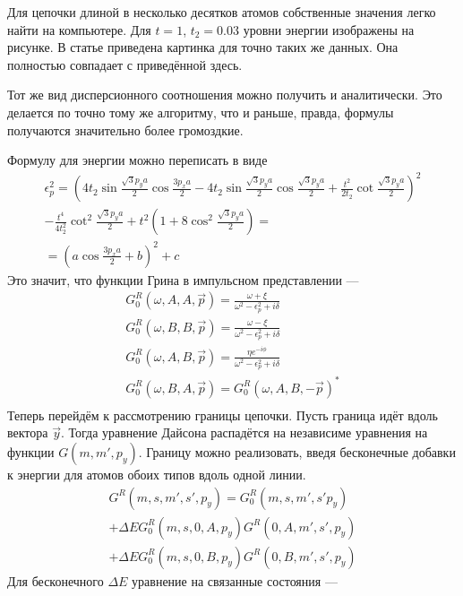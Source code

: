 	Для цепочки длиной в несколько десятков атомов собственные значения легко найти на 
	компьютере. Для $t = 1$, $t_2 = 0.03$ уровни 
	энергии изображены на рисунке.
	В статье \cite{Kane2005} приведена картинка для точно таких же данных. Она полностью
	совпадает с приведённой здесь.
	
	Тот же вид дисперсионного соотношения можно получить и аналитически. Это делается по 
	точно тому же алгоритму, что и раньше, правда, формулы получаются значительно более
	громоздкие.

	Формулу для энергии можно переписать в виде
	\begin{multline}
		\epsilon_p^2 = \left(4t_2\sin{\frac{\sqrt{3}p_ya}{2}} \cos{\frac{3p_xa}{2}} - 
				4t_2\sin{\frac{\sqrt{3}p_ya}{2}} \cos{\frac{\sqrt{3}p_ya}{2}} +
				\frac{t^2}{2t_2} \cot{\frac{\sqrt{3}p_ya}{2}}\right)^2\\
				- \frac{t^4}{4t_2^2}\cot^2{\frac{\sqrt{3}p_ya}{2}}
				+ t^2\left(1 + 8\cos^2{\frac{\sqrt{3}p_ya}{2}}\right) = \\
				= \left(a\cos{\frac{3p_xa}{2}} + b\right)^2 + c
	\end{multline}
	Это значит, что функции Грина в импульсном представлении ---
	\begin{equation}
		\begin{split}
		G^R_0(\omega,A,A, \vec{p}) = \frac{\omega + \xi}{\omega^2 - \epsilon_p^2 + i\delta}\\
		G^R_0(\omega,B,B, \vec{p}) = \frac{\omega - \xi}{\omega^2 - \epsilon_p^2 + i\delta}\\
		G^R_0(\omega,A,B, \vec{p}) = 
			\frac{\eta e^{-i\phi}}{\omega^2 - \epsilon_p^2 + i\delta}\\
		G^R_0(\omega,B,A, \vec{p}) = G^R_0(\omega,A,B, -\vec{p})^{*}\\
		\end{split}
	\end{equation}
	Теперь перейдём к рассмотрению границы цепочки. 
	Пусть граница идёт вдоль вектора $\vec{y}$.
	Тогда уравнение Дайсона распадётся на независиме уравнения 
	на функции $G(m,m',p_y)$. Границу
	можно реализовать, введя бесконечные добавки к энергии для атомов обоих типов вдоль
	одной линии.
	\begin{multline}
		G^R(m,s,m',s',p_y) = G^R_0(m,s,m',s'p_y)  \\
			+\Delta E G^R_0(m,s,0,A,p_y)G^R(0,A,m',s',p_y)  \\
						+\Delta E G^R_0(m,s,0,B,p_y)G^R(0,B,m',s',p_y) 
	\end{multline}
	Для бесконечного $\Delta E$ уравнение на связанные состояния ---
